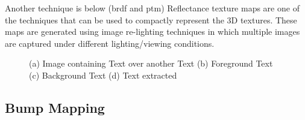 Another technique is below (brdf and ptm)
Reflectance texture maps are one of
the techniques that can be used to compactly represent the 3D textures. These
maps are generated using image re-lighting techniques in which
multiple images are captured under different lighting/viewing conditions.


\begin{figure}[t]
\centering
{}
\caption
{(a) Image containing Text over another Text (b) Foreground Text (c) Background Text (d)
Text extracted}
\label{fig:model}
\end{figure}


\subsection{Bump Mapping}

